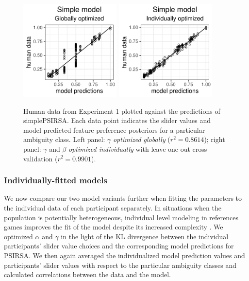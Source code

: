 \documentclass[11pt,a4paper]{article}
\newcommand{\gcs}[1]{\textcolor{blue}{[gcs: #1]}}
\begin{document}
\begin{figure}[ht]
	\centering
	\includegraphics[width=2in]{images/m13.pdf}
	\includegraphics[width=2in]{images/m8.pdf}
		\caption{Human data from Experiment 1 plotted against the predictions of simplePSIRSA. %
		Each data point indicates the slider values and model predicted feature preference posteriors for a particular ambiguity class.
		Left panel: $\gamma$ \emph{optimized globally} ($r^2 = 0.8614$); 
		right panel: $\gamma$ and $\beta$ \emph{optimized individually} with leave-one-out cross-validation ($r^{2}=0.9901$).
	}
		\label{simple-global-and-cross-validated}
\end{figure}


\subsubsection{Individually-fitted models}

We now compare our two model variants further when fitting the parameters to the individual data of each participant separately. In situations when the population is potentially heterogeneous, individual level modeling in references games improves the fit of the model despite its increased complexity \cite{franke2016reasoning}.
We optimized $\alpha$ and $\gamma$ in the light of the KL divergence between the individual participants' slider value choices and the corresponding model predictions for PSIRSA.
We then again averaged the individualized model prediction values and participants' slider values with respect to the particular ambiguity classes and calculated correlations between the data and the model.
\end{document}
